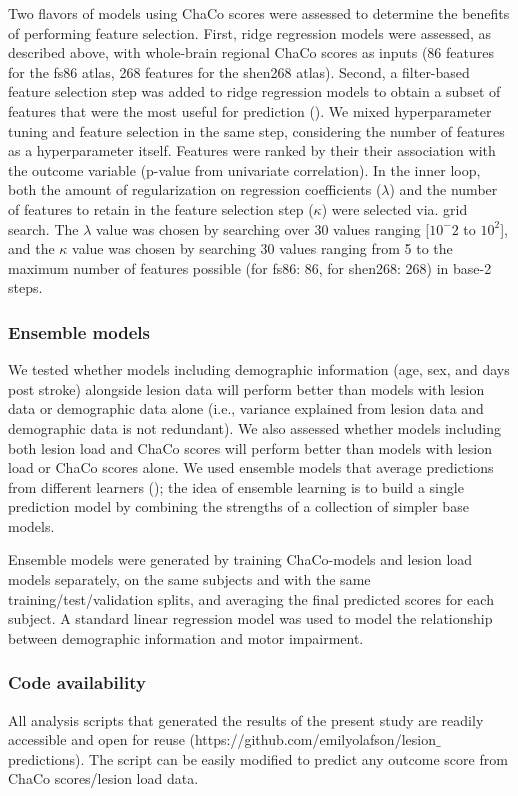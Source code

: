 \documentclass[10pt]{article}
\begin{document}
Two flavors of models using ChaCo scores were assessed to determine the benefits of performing feature selection. First, ridge regression models were assessed, as described above, with whole-brain regional ChaCo scores as inputs (86 features for the fs86 atlas, 268 features for the shen268 atlas). Second, a filter-based feature selection step was added to ridge regression models to obtain a subset of features that were the most useful for prediction (\cite{Hall1999-qr, Pudjihartono2022-zg}). We mixed hyperparameter tuning and feature selection in the same step, considering the number of features as a hyperparameter itself. Features were ranked by their their association with the outcome variable (p-value from univariate correlation). In the inner loop, both the amount of regularization on regression coefficients ($\lambda$) and the number of features to retain in the feature selection step ($\kappa$) were selected via. grid search. The $\lambda$ value was chosen by searching over 30 values ranging [$10^-2$ to $10^2$], and the $\kappa$ value was chosen by searching 30 values ranging from 5 to the maximum number of features possible (for fs86: 86, for shen268: 268) in base-2 steps. 

\subsubsection*{Ensemble models}

We tested whether models including demographic information (age, sex, and days post stroke) alongside lesion data will perform better than models with lesion data or demographic data alone (i.e., variance explained from lesion data and demographic data is not redundant). We also assessed whether models including both lesion load and ChaCo scores will perform better than models with lesion load or ChaCo scores alone. We used ensemble models that average predictions from different learners (\cite{Hastie2001-or}); the idea of ensemble learning is to build a single prediction model by combining the strengths of a collection of simpler base models. 

Ensemble models were generated by training ChaCo-models and lesion load models separately, on the same subjects and with the same training/test/validation splits, and averaging the final predicted scores for each subject. A standard linear regression model was used to model the relationship between demographic information and motor impairment. 

\subsubsection*{Code availability}
All analysis scripts that generated the results of the present study are readily accessible and open for reuse (https://github.com/emilyolafson/lesion$\_$predictions). The script can be easily modified to predict any outcome score from ChaCo scores/lesion load data.
\end{document}
